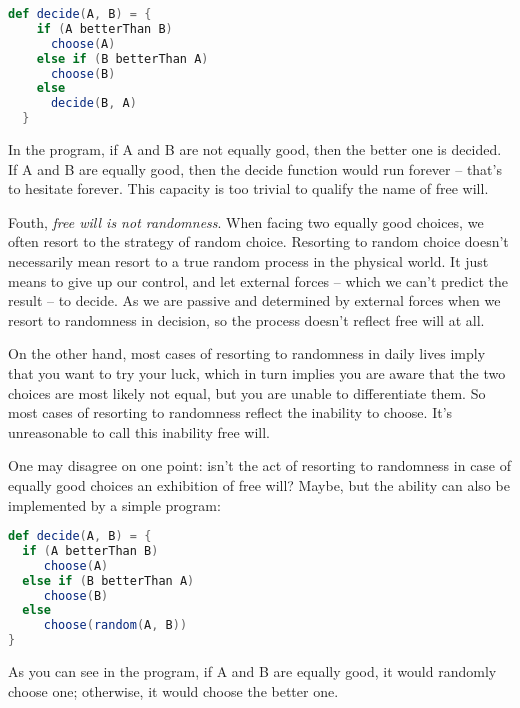 \begin{lstlisting}[language=Scala]
  def decide(A, B) = {
    if (A betterThan B)
      choose(A)
    else if (B betterThan A)
      choose(B)
    else
      decide(B, A)
  }
\end{lstlisting}

In the program, if A and B are not equally good, then the better one is decided. If A and B are equally good, then the decide function would run forever -- that's to hesitate forever. This capacity is too trivial to qualify the name of free will.


Fouth, \emph{free will is not randomness}. When facing two equally good choices, we often resort to the strategy of random choice. Resorting to random choice doesn't necessarily mean resort to a true random process in the physical world. It just means to give up our control, and let external forces -- which we can't predict the result -- to decide. As we are passive and determined by external forces when we resort to randomness in decision, so the process doesn't reflect free will at all.

On the other hand, most cases of resorting to randomness in daily lives imply that you want to try your luck, which in turn implies you are aware that the two choices are most likely not equal, but you are unable to differentiate them. So most cases of resorting to randomness reflect the inability to choose. It's unreasonable to call this inability free will.

One may disagree on one point: isn't the act of resorting to randomness in case of equally good choices an exhibition of free will? Maybe, but the ability can also be implemented by a simple program:

\begin{lstlisting}[language=Scala]
def decide(A, B) = {
  if (A betterThan B)
     choose(A)
  else if (B betterThan A)
     choose(B)
  else
     choose(random(A, B))
}
\end{lstlisting}

As you can see in the program, if A and B are equally good, it would randomly choose one; otherwise, it would choose the better one.

